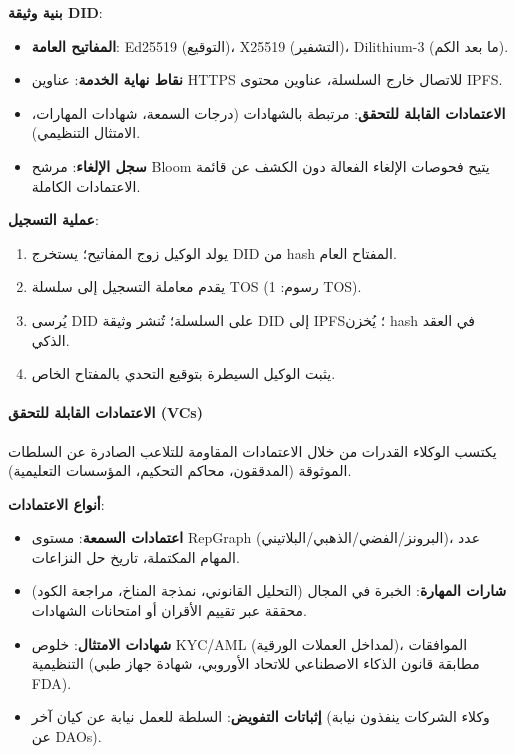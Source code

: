 \documentclass[11pt]{article}
\begin{document}
\textbf{بنية وثيقة DID}:
\begin{itemize}[noitemsep]
  \item \textbf{المفاتيح العامة}: Ed25519 (التوقيع)، X25519 (التشفير)، Dilithium-3 (ما بعد الكم).
  \item \textbf{نقاط نهاية الخدمة}: عناوين HTTPS للاتصال خارج السلسلة، عناوين محتوى IPFS.
  \item \textbf{الاعتمادات القابلة للتحقق}: مرتبطة بالشهادات (درجات السمعة، شهادات المهارات، الامتثال التنظيمي).
  \item \textbf{سجل الإلغاء}: مرشح Bloom يتيح فحوصات الإلغاء الفعالة دون الكشف عن قائمة الاعتمادات الكاملة.
\end{itemize}

\textbf{عملية التسجيل}:
\begin{enumerate}[noitemsep]
  \item يولد الوكيل زوج المفاتيح؛ يستخرج DID من hash المفتاح العام.
  \item يقدم معاملة التسجيل إلى سلسلة TOS (رسوم: 1 TOS).
  \item يُرسى DID على السلسلة؛ تُنشر وثيقة DID إلى IPFS؛ يُخزن hash في العقد الذكي.
  \item يثبت الوكيل السيطرة بتوقيع التحدي بالمفتاح الخاص.
\end{enumerate}

\paragraph{الاعتمادات القابلة للتحقق (VCs)}
يكتسب الوكلاء القدرات من خلال الاعتمادات المقاومة للتلاعب الصادرة عن السلطات الموثوقة (المدققون، محاكم التحكيم، المؤسسات التعليمية).

\textbf{أنواع الاعتمادات}:
\begin{itemize}[noitemsep]
  \item \textbf{اعتمادات السمعة}: مستوى RepGraph (البرونز/الفضي/الذهبي/البلاتيني)، عدد المهام المكتملة، تاريخ حل النزاعات.
  \item \textbf{شارات المهارة}: الخبرة في المجال (التحليل القانوني، نمذجة المناخ، مراجعة الكود) محققة عبر تقييم الأقران أو امتحانات الشهادات.
  \item \textbf{شهادات الامتثال}: خلوص KYC/AML (لمداخل العملات الورقية)، الموافقات التنظيمية (مطابقة قانون الذكاء الاصطناعي للاتحاد الأوروبي، شهادة جهاز طبي FDA).
  \item \textbf{إثباتات التفويض}: السلطة للعمل نيابة عن كيان آخر (وكلاء الشركات ينفذون نيابة عن DAOs).
\end{itemize}
\end{document}
